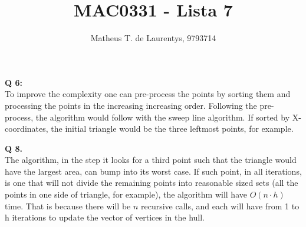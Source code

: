 \documentclass[]{article}
\title{\vspace{-4.0cm}MAC0331 - Lista 7}
\author{Matheus T. de Laurentys, 9793714}
\begin{document}
	\maketitle
	\noindent
	\textbf{Q 6:} \\
	To improve the complexity one can pre-process the points by sorting them and processing the points in the increasing increasing order. Following the pre-process, the algorithm would follow with the sweep line algorithm. If sorted by X-coordinates, the initial triangle would be the three leftmost points, for example.
	
	\noindent
	\textbf{Q 8.} \\
	The algorithm, in the step it looks for a third point such that the triangle would have the largest area, can bump into its worst case. If such point, in all iterations, is one that will not divide the remaining points into reasonable sized sets (all the points in one side of triangle, for example), the algorithm will have $O(n \cdot h)$ time.  That is because there will be $n$ recursive calls, and each will have from 1 to h iterations to update the vector of vertices in the hull. 
\end{document}
